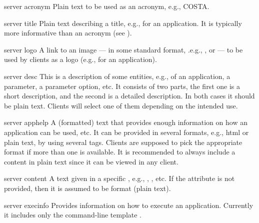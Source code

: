 \bigskip
\xmlstruct
{server}
{acronym}
{%
%
  Plain text to be used as an acronym, e.g., COSTA.
%
}



\bigskip
\xmlstruct
{server}
{title}
{%
%
  Plain text describing a title, e.g., for an application. It is
  typically more informative than an acronym (see
  ).
%
}



\bigskip
\xmlstruct
{server}
{logo}
{%
%
  A link to an image --- in some standard format, .e.g.,
  ,  or 
  --- to be used by clients as a logo (e.g., for an application).
%
}



\bigskip
\xmlstruct
{server}
{desc}
{%
%
  This is a description of some entities, e.g., of an application, a
  parameter, a parameter option, etc. It consists of two parts, the
  first one is a short description, and the second is a detailed
  description. In both cases it should be plain text. Clients will
  select one of them depending on the intended use.
%
}
{}%


\bigskip
\xmlstruct
{server}
{apphelp}
{%
%
  A (formatted) text that provides enough information on how an
  application can be used, etc. It can be provided in several formats,
  e.g., html or plain text, by using several
   tags. Clients are supposed to pick
  the appropriate format if more than one is available. It is
  recommended to always include a content in plain text since it can
  be viewed in any client.
%
}



\bigskip
\xmlstruct
{server}
{content}
{%
%
  A text given in a specific , e.g.,
  , , etc. If the
  attribute  is not provided, then it is assumed
  to be  format (plain text).
%
}


\bigskip
\xmlstruct
{server}
{execinfo}
{%
%
  Provides information on how to execute an application. Currently it
  includes only the command-line template
  .
%
}


